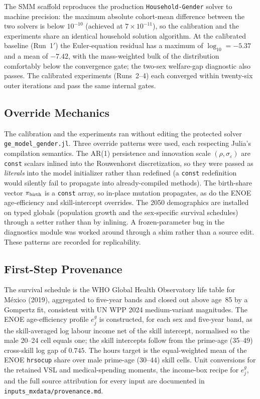 \documentclass[12pt,a4paper]{article}
\begin{document}
\begin{appendices}
The SMM scaffold reproduces the production \texttt{Household-Gender} solver to machine precision: the maximum absolute cohort-mean difference between the two solvers is below $10^{-10}$ (achieved at $7\times10^{-11}$), so the calibration and the experiments share an identical household solution algorithm. At the calibrated baseline (Run~1$'$) the Euler-equation residual has a maximum of $\log_{10}=-5.37$ and a mean of $-7.42$, with the mass-weighted bulk of the distribution comfortably below the convergence gate; the two-sex welfare-gap diagnostic also passes. The calibrated experiments (Runs~2--4) each converged within twenty-six outer iterations and pass the same internal gates.

\subsection{Override Mechanics}
\label{app:overrides}

The calibration and the experiments ran without editing the protected solver \texttt{ge\_model\_gender.jl}. Three override patterns were used, each respecting Julia's compilation semantics. The AR(1) persistence and innovation scale $(\rho,\sigma_\varepsilon)$ are \texttt{const} scalars inlined into the Rouwenhorst discretization, so they were passed as \emph{literals} into the model initializer rather than redefined (a \texttt{const} redefinition would silently fail to propagate into already-compiled methods). The birth-share vector $\pi_{\rm birth}$ is a \texttt{const} array, so in-place mutation propagates, as do the ENOE age-efficiency and skill-intercept overrides. The 2050 demographics are installed on typed globals (population growth and the sex-specific survival schedules) through a setter rather than by inlining. A frozen-parameter bug in the diagnostics module was worked around through a shim rather than a source edit. These patterns are recorded for replicability.

\subsection{First-Step Provenance}
\label{app:provenance}

The survival schedule is the WHO Global Health Observatory life table for M\'exico (2019), aggregated to five-year bands and closed out above age~85 by a Gompertz fit, consistent with UN WPP 2024 medium-variant magnitudes. The ENOE age-efficiency profile $e^g_j$ is constructed, for each sex and five-year band, as the skill-averaged log labour income net of the skill intercept, normalised so the male 20--24 cell equals one; the skill intercepts follow from the prime-age (35--49) cross-skill log gap of $0.745$. The hours target is the equal-weighted mean of the ENOE \texttt{hrsocup} share over male prime-age (30--44) skill cells. Unit conversions for the retained VSL and medical-spending moments, the income-box recipe for $e^g_j$, and the full source attribution for every input are documented in \texttt{inputs\_mxdata/provenance.md}.


\end{appendices}
\end{document}
